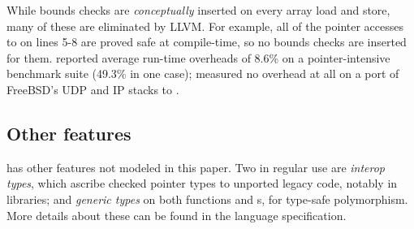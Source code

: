 While bounds checks are \emph{conceptually} inserted on every array
load and store, many of these are eliminated by LLVM\@. For example,
all of the pointer accesses to  on lines 5-8 are proved safe
at compile-time, so no bounds checks are inserted for
them. \citet{Elliott2018}
reported average run-time overheads of 8.6\% on a pointer-intensive
benchmark suite (49.3\% in one case); \citet{duanrefactoring} measured
no overhead at all on a port of FreeBSD's UDP and IP stacks to \checkedc.


\subsection{Other features}

\checkedc has other features not modeled in this paper. Two in regular
use are \emph{interop types}, which ascribe checked pointer types to
unported legacy code, notably in libraries; and \emph{generic types}
on both functions and s, for type-safe polymorphism. More
details about these can be found in the language specification.

